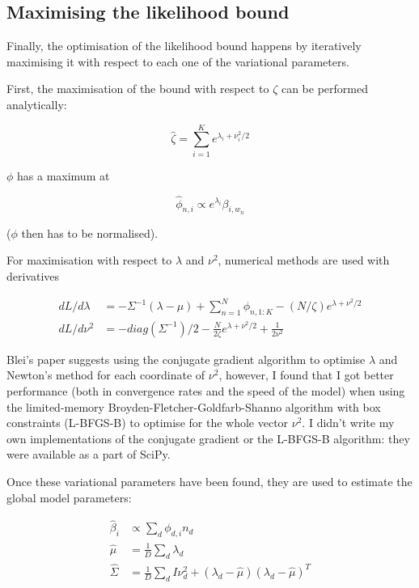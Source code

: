 \documentclass[12pt,a4paper,twoside,openright]{report}
\begin{document}
\subsection{Maximising the likelihood bound}

Finally, the optimisation of the likelihood bound happens by iteratively maximising it with respect to each one of the variational parameters.

First, the maximisation of the bound with respect to $\zeta$ can be performed analytically:

\begin{equation}
\hat\zeta = \sum\limits_{i=1}^Ke^{\lambda_i + \nu_i^2 / 2}
\end{equation}

$\phi$ has a maximum at

\begin{equation}
\hat\phi_{n, i} \propto e^{\lambda_i}\beta_{i, w_n} \label{eq:phiopt}
\end{equation}

($\phi$ then has to be normalised).

For maximisation with respect to $\lambda$ and $\nu^2$, numerical methods are used with derivatives

\begin{align}
dL/d\lambda & = -\Sigma^{-1}(\lambda - \mu) + \sum\limits_{n=1}^N\phi_{n, 1:K} - (N/\zeta)e^{\lambda + \nu^2/2} \\
dL/d\nu^2 & = -\mathit{diag}(\Sigma^{-1})/2 - \frac{N}{2\zeta}e^{\lambda + \nu^2/2} + \frac{1}{2\nu^2}
\end{align}

Blei's paper suggests using the conjugate gradient algorithm to optimise $\lambda$ and Newton's method for each coordinate of $\nu^2$, however, I found that I got better performance (both in convergence rates and the speed of the model) when using the limited-memory Broyden-Fletcher-Goldfarb-Shanno algorithm with box constraints (L-BFGS-B) to optimise for the whole vector $\nu^2$. I didn't write my own implementations of the conjugate gradient or the L-BFGS-B algorithm: they were available as a part of SciPy.

Once these variational parameters have been found, they are used to estimate the global model parameters:

\begin{align}
\hat\beta_i & \propto \sum\limits_d\phi_{d, i}n_d \\ \label{eq:betaopt}
\hat\mu & = \frac{1}{D} \sum\limits_d\lambda_d \\ 
\hat\Sigma & = \frac{1}{D} \sum\limits_d I\nu^2_d + (\lambda_d - \hat\mu)(\lambda_d - \hat\mu)^T
\end{align}
\end{document}
